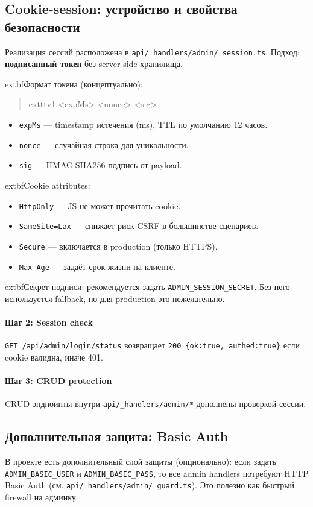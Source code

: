 \documentclass[12pt,a4paper]{article}
\begin{document}
\subsection{Cookie-session: устройство и свойства безопасности}
Реализация сессий расположена в \texttt{api/\_handlers/admin/\_session.ts}. Подход: \textbf{подписанный токен} без server-side хранилища.

	extbf{Формат токена (концептуально):}
\begin{quote}
	exttt{v1.<expMs>.<nonce>.<sig>}
\end{quote}
\begin{itemize}[leftmargin=18pt]
  \item \texttt{expMs} --- timestamp истечения (ms), TTL по умолчанию 12 часов.
  \item \texttt{nonce} --- случайная строка для уникальности.
  \item \texttt{sig} --- HMAC-SHA256 подпись от payload.
\end{itemize}

	extbf{Cookie attributes:}
\begin{itemize}[leftmargin=18pt]
  \item \texttt{HttpOnly} --- JS не может прочитать cookie.
  \item \texttt{SameSite=Lax} --- снижает риск CSRF в большинстве сценариев.
  \item \texttt{Secure} --- включается в production (только HTTPS).
  \item \texttt{Max-Age} --- задаёт срок жизни на клиенте.
\end{itemize}

	extbf{Секрет подписи:} рекомендуется задать \texttt{ADMIN\_SESSION\_SECRET}. Без него используется fallback, но для production это нежелательно.

\paragraph{Шаг 2: Session check}
\texttt{GET /api/admin/login/status} возвращает \texttt{200 \{ok:true, authed:true\}} если cookie валидна, иначе 401.

\paragraph{Шаг 3: CRUD protection}
CRUD эндпоинты внутри \texttt{api/_handlers/admin/*} дополнены проверкой сессии.

\subsection{Дополнительная защита: Basic Auth}
В проекте есть дополнительный слой защиты (опционально): если задать \texttt{ADMIN\_BASIC\_USER} и \texttt{ADMIN\_BASIC\_PASS}, то все admin handlers потребуют HTTP Basic Auth (см. \texttt{api/_handlers/admin/_guard.ts}). Это полезно как быстрый firewall на админку.
\end{document}

